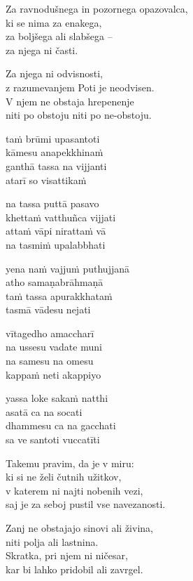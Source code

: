 Za ravnodušnega in pozornega opazovalca,\\
ki se nima za enakega,\\
za boljšega ali slabšega --\\
za njega ni časti.

Za njega ni odvisnosti,\\
z razumevanjem Poti je neodvisen.\\
V njem ne obstaja hrepenenje\\
niti po obstoju niti po ne-obstoju.


\clearpage

taṁ brūmi upasantoti\\
kāmesu anapekkhinaṁ\\
ganthā tassa na vijjanti\\
atarī so visattikaṁ

na tassa puttā pasavo\\
khettaṁ vatthuñca vijjati\\
attaṁ vāpi nirattaṁ vā\\
na tasmiṁ upalabbhati

yena naṁ vajjuṁ puthujjanā\\
atho samaṇabrāhmaṇā\\
taṁ tassa apurakkhataṁ\\
tasmā vādesu nejati

vītagedho amaccharī\\
na ussesu vadate muni\\
na samesu na omesu\\
kappaṁ neti akappiyo

yassa loke sakaṁ natthi\\
asatā ca na socati\\
dhammesu ca na gacchati\\
sa ve santoti vuccatīti


\clearpage

Takemu pravim, da je v miru:\\
ki si ne želi čutnih užitkov,\\
v katerem ni najti nobenih vezi,\\
saj je za seboj pustil vse navezanosti.

Zanj ne obstajajo sinovi ali živina,\\
niti polja ali lastnina.\\
Skratka, pri njem ni ničesar,\\
kar bi lahko pridobil ali zavrgel.

